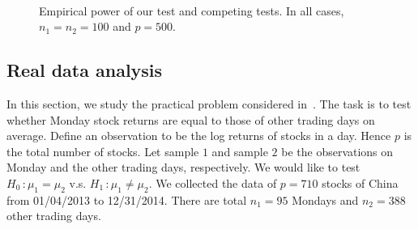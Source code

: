 \documentclass[3p]{elsarticle}
\theoremstyle{plain}
\theoremstyle{definition}
\theoremstyle{remark}
\begin{document}
\begin{figure}
    \\
    \caption{Empirical power of our test and competing tests. In all cases, $n_1=n_2=100$ and $p=500$.}\label{fig:Power2}
\end{figure}




\subsection{Real data analysis}
In this section, we study the practical problem considered in~\cite{Ma2015A}.
The task is to test whether Monday stock returns are equal to those of other trading days on average.
Define an observation to be the log returns of stocks in a day.
Hence $p$ is the total number of stocks.
Let sample $1$ and sample $2$ be the observations on Monday and the other trading days, respectively.
We would like to test $H_0\, :\mu_1=\mu_2$ v.s. $H_1\,:\mu_1\neq \mu_2$.
We collected the data of $p=710$
 stocks of China
from 01/04/2013 to 12/31/2014. There are total $n_1=95$ Mondays and $n_2=388$ other trading days. 
\end{document}
